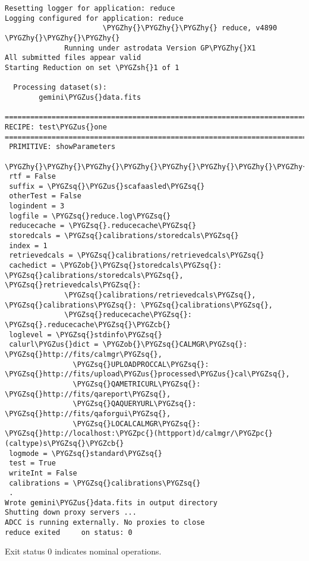 \documentclass[letterpaper,10pt,english]{sphinxmanual}
\def\PYGZus{\char`\_}
\def\PYGZob{\char`\{}
\def\PYGZcb{\char`\}}
\def\PYGZsh{\char`\#}
\def\PYGZpc{\char`\%}
\def\PYGZhy{\char`\-}
\def\PYGZsq{\char`\'}
\begin{document}
\begin{Verbatim}[commandchars=\\\{\}]
Resetting logger for application: reduce
Logging configured for application: reduce
                       \PYGZhy{}\PYGZhy{}\PYGZhy{} reduce, v4890  \PYGZhy{}\PYGZhy{}\PYGZhy{}
              Running under astrodata Version GP\PYGZhy{}X1
All submitted files appear valid
Starting Reduction on set \PYGZsh{}1 of 1

  Processing dataset(s):
        gemini\PYGZus{}data.fits

==============================================================================
RECIPE: test\PYGZus{}one
==============================================================================
 PRIMITIVE: showParameters
 \PYGZhy{}\PYGZhy{}\PYGZhy{}\PYGZhy{}\PYGZhy{}\PYGZhy{}\PYGZhy{}\PYGZhy{}\PYGZhy{}\PYGZhy{}\PYGZhy{}\PYGZhy{}\PYGZhy{}\PYGZhy{}\PYGZhy{}\PYGZhy{}\PYGZhy{}\PYGZhy{}\PYGZhy{}\PYGZhy{}\PYGZhy{}\PYGZhy{}\PYGZhy{}\PYGZhy{}\PYGZhy{}
 rtf = False
 suffix = \PYGZsq{}\PYGZus{}scafaasled\PYGZsq{}
 otherTest = False
 logindent = 3
 logfile = \PYGZsq{}reduce.log\PYGZsq{}
 reducecache = \PYGZsq{}.reducecache\PYGZsq{}
 storedcals = \PYGZsq{}calibrations/storedcals\PYGZsq{}
 index = 1
 retrievedcals = \PYGZsq{}calibrations/retrievedcals\PYGZsq{}
 cachedict = \PYGZob{}\PYGZsq{}storedcals\PYGZsq{}: \PYGZsq{}calibrations/storedcals\PYGZsq{}, \PYGZsq{}retrievedcals\PYGZsq{}:
              \PYGZsq{}calibrations/retrievedcals\PYGZsq{}, \PYGZsq{}calibrations\PYGZsq{}: \PYGZsq{}calibrations\PYGZsq{},
              \PYGZsq{}reducecache\PYGZsq{}: \PYGZsq{}.reducecache\PYGZsq{}\PYGZcb{}
 loglevel = \PYGZsq{}stdinfo\PYGZsq{}
 calurl\PYGZus{}dict = \PYGZob{}\PYGZsq{}CALMGR\PYGZsq{}: \PYGZsq{}http://fits/calmgr\PYGZsq{},
                \PYGZsq{}UPLOADPROCCAL\PYGZsq{}: \PYGZsq{}http://fits/upload\PYGZus{}processed\PYGZus{}cal\PYGZsq{},
                \PYGZsq{}QAMETRICURL\PYGZsq{}: \PYGZsq{}http://fits/qareport\PYGZsq{},
                \PYGZsq{}QAQUERYURL\PYGZsq{}: \PYGZsq{}http://fits/qaforgui\PYGZsq{},
                \PYGZsq{}LOCALCALMGR\PYGZsq{}: \PYGZsq{}http://localhost:\PYGZpc{}(httpport)d/calmgr/\PYGZpc{}(caltype)s\PYGZsq{}\PYGZcb{}
 logmode = \PYGZsq{}standard\PYGZsq{}
 test = True
 writeInt = False
 calibrations = \PYGZsq{}calibrations\PYGZsq{}
 .
Wrote gemini\PYGZus{}data.fits in output directory
Shutting down proxy servers ...
ADCC is running externally. No proxies to close
reduce exited     on status: 0
\end{Verbatim}

Exit status 0 indicates nominal operations.
\end{document}
